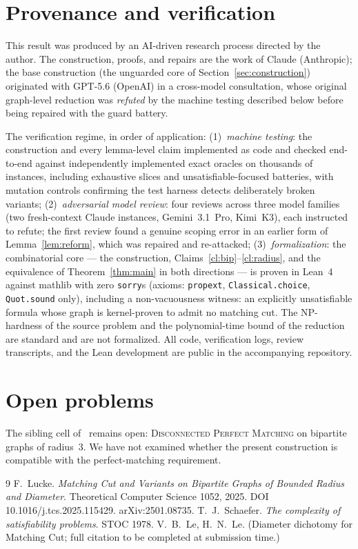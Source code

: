 \documentclass[11pt]{article}
\begin{document}
\section{Provenance and verification}\label{sec:provenance}

This result was produced by an AI-driven research process directed by
the author. The construction, proofs, and repairs are the work of
Claude (Anthropic); the base construction (the unguarded core of
Section~\ref{sec:construction}) originated with GPT-5.6 (OpenAI) in a
cross-model consultation, whose original graph-level reduction was
\emph{refuted} by the machine testing described below before being
repaired with the guard battery.

The verification regime, in order of application:
(1)~\emph{machine testing}: the construction and every lemma-level
claim implemented as code and checked end-to-end against
independently implemented exact oracles on thousands of instances,
including exhaustive slices and unsatisfiable-focused batteries, with
mutation controls confirming the test harness detects deliberately
broken variants; (2)~\emph{adversarial model review}: four reviews
across three model families (two fresh-context Claude instances,
Gemini~3.1~Pro, Kimi~K3), each instructed to refute; the first review
found a genuine scoping error in an earlier form of
Lemma~\ref{lem:reform}, which was repaired and re-attacked;
(3)~\emph{formalization}: the combinatorial core --- the construction,
Claims~\ref{cl:bip}--\ref{cl:radius}, and the equivalence of
Theorem~\ref{thm:main} in both directions --- is proven in Lean~4
against mathlib with zero \texttt{sorry}s (axioms:
\texttt{propext}, \texttt{Classical.choice}, \texttt{Quot.sound}
only), including a non-vacuousness witness: an explicitly
unsatisfiable formula whose graph is kernel-proven to admit no
matching cut. The NP-hardness of the source problem and the
polynomial-time bound of the reduction are standard and are not
formalized. All code, verification logs, review transcripts, and the
Lean development are public in the accompanying repository.

\section{Open problems}

The sibling cell of~\cite{Lucke25} remains open:
\textsc{Disconnected Perfect Matching} on bipartite graphs of
radius~3. We have not examined whether the present construction is
compatible with the perfect-matching requirement.

\begin{thebibliography}{9}
 F.~Lucke.
\emph{Matching Cut and Variants on Bipartite Graphs of Bounded Radius
and Diameter}. Theoretical Computer Science 1052, 2025. DOI 10.1016/j.tcs.2025.115429. arXiv:2501.08735.
 T.~J.~Schaefer. \emph{The complexity of
satisfiability problems}. STOC 1978.
 V.~B.~Le, H.~N.~Le. (Diameter dichotomy for
Matching Cut; full citation to be completed at submission time.)
\end{thebibliography}
\end{document}
